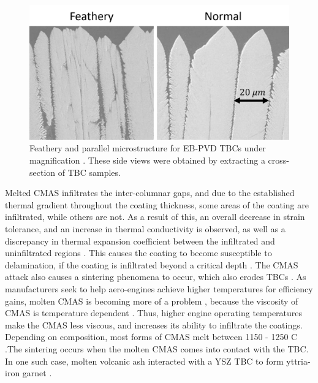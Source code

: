 \documentclass[%
 aip,
 amsmath,amssymb,
 reprint,%
]{revtex4-1}
\begin{document}
\begin{figure}
\includegraphics[width=.9\linewidth]{Figures/SEM.png}
\caption{Feathery and parallel microstructure for EB-PVD TBCs under magnification \cite{Naraparaju2017}. These side views were obtained by extracting a cross-section of TBC samples.}
\label{fig:TBC_scans}
\end{figure}

Melted CMAS infiltrates the inter-columnar gaps, and due to the established thermal gradient throughout the coating thickness, some areas of the coating are infiltrated, while others are not. As a result of this, an overall decrease in strain tolerance, and an increase in thermal conductivity is observed, as well as a discrepancy in thermal expansion coefficient between the infiltrated and uninfiltrated regions \cite{KAKUDA2015350,WU20111881, KRAMER200826}. This causes the coating to become susceptible to delamination, if the coating is infiltrated beyond a critical depth \cite{MERCER20051029}. The CMAS attack also causes a sintering phenomena to occur, which also erodes TBCs \cite{Peng2012}. As manufacturers seek to help aero-engines achieve higher temperatures for efficiency gains, molten CMAS is becoming more of a problem \cite{Boyce2012}, because the viscosity of CMAS is temperature dependent \cite{Naraparaju2017}. Thus, higher engine operating temperatures make the CMAS less viscous, and increases its ability to infiltrate the coatings. Depending on composition, most forms of CMAS melt between 1150 - 1250 \degree C \cite{Costa2019,Naraparaju2014,Wellman2010,Kramer2006}.The sintering occurs when the molten CMAS comes into contact with the TBC. In one such case, molten volcanic ash interacted with a YSZ TBC to form yttria-iron garnet \cite{Xia2019}.
\end{document}

